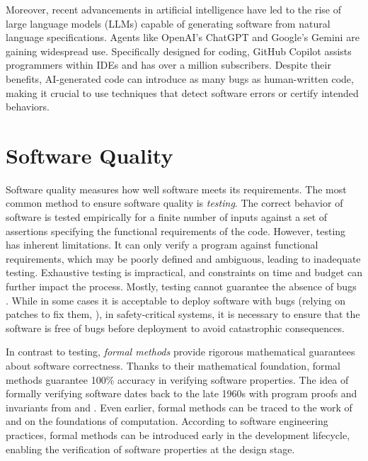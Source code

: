 Moreover, recent advancements in artificial intelligence have led to the rise of large language models (LLMs) capable of generating software from natural language specifications.
Agents like OpenAI's ChatGPT and Google's Gemini are gaining widespread use.
Specifically designed for coding, GitHub Copilot assists programmers within IDEs and has over a million subscribers.
Despite their benefits, AI-generated code can introduce as many bugs as human-written code, making it crucial to use techniques that detect software errors or certify intended behaviors.

\section{Software Quality}

Software quality measures how well software meets its requirements.
The most common method to ensure software quality is \emph{testing}.
The correct behavior of software is tested empirically for a finite number of inputs against a set of assertions specifying the functional requirements of the code.
However, testing has inherent limitations.
It can only verify a program against functional requirements, which may be poorly defined and ambiguous, leading to inadequate testing.
Exhaustive testing is impractical, and constraints on time and budget can further impact the process.
Mostly, testing cannot guarantee the absence of bugs .
While in some cases it is acceptable to deploy software with bugs (relying on patches to fix them, ), in safety-critical systems, it is necessary to ensure that the software is free of bugs before deployment to avoid catastrophic consequences.

In contrast to testing, \emph{formal methods} provide rigorous mathematical guarantees about software correctness.
Thanks to their mathematical foundation, formal methods guarantee 100\% accuracy in verifying software properties.
The idea of formally verifying software dates back to the late 1960s with program proofs and invariants from  and .
Even earlier, formal methods can be traced to the work of  and  on the foundations of computation.
According to software engineering practices, formal methods can be introduced early in the development lifecycle, enabling the verification of software properties at the design stage.

